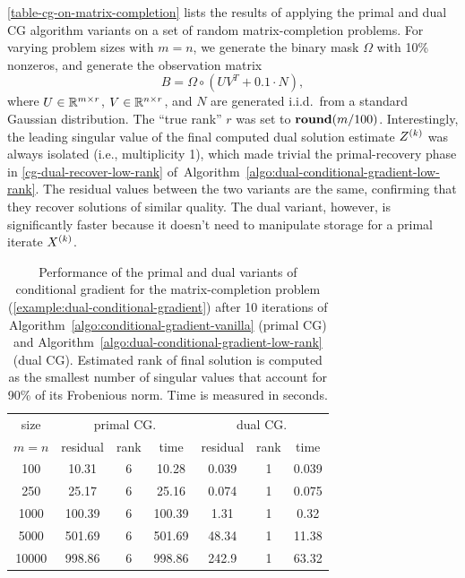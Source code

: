 \begin{example}
  \autoref{table-cg-on-matrix-completion} lists the results of applying the primal
  and dual CG algorithm variants on a set of random matrix-completion problems.
  For varying problem sizes with $m=n$, we generate the binary mask $\Omega$
  with 10\% nonzeros, and generate the observation matrix
  \[
    B = \Omega\circ(UV^T+0.1\cdot N), 
  \]
  where $U\in\mathbb{R}^{m\times r}$, $V\in\mathbb{R}^{n\times r}$, and $N$ are generated
  i.i.d.~from a standard Gaussian distribution. The ``true rank'' $r$ was set to
  $\mathop{\bf round}(m/100)$. Interestingly, the leading singular value of the
  final computed dual solution estimate $Z^{(k)}$ was always isolated (i.e.,
  multiplicity 1), which made trivial the primal-recovery phase in
  \autoref{cg-dual-recover-low-rank}
  of~Algorithm~\ref{algo:dual-conditional-gradient-low-rank}. The residual values between
  the two variants are the same, confirming that they recover solutions of
  similar quality. The dual variant, however, is significantly faster because it
  doesn't need to manipulate storage for a primal iterate $X^{(k)}$.
  
  \begin{table}[t]
    \centering
    \begin{tabular}{ccccccc}
        \toprule
        size & \multicolumn{3}{c}{primal CG.} & \multicolumn{3}{c}{dual CG.}\\
        \cmidrule(lr){1-1}\cmidrule(lr){2-4}\cmidrule(lr){5-7}
        $m=n$ & residual & rank & time & residual & rank & time \\ 
        \hline
        100      &10.31  &6     &10.28 &0.039     &1     &0.039 \\
        250      &25.17  &6     &25.16 &0.074     &1     &0.075 \\
        1000    &100.39  &6    &100.39 &1.31      &1     &0.32 \\
        5000    &501.69  &6    &501.69 &48.34     &1     &11.38 \\
        10000   &998.86  &6    &998.86 &242.9     &1     &63.32 \\
        \bottomrule
    \end{tabular}
      \caption{Performance of the primal and dual variants of conditional gradient
      for the matrix-completion problem
      (\autoref{example:dual-conditional-gradient})
      after 10 iterations of
      Algorithm~\ref{algo:conditional-gradient-vanilla} (primal CG) and
         Algorithm~\ref{algo:dual-conditional-gradient-low-rank} (dual CG). Estimated rank of final
         solution is computed as the smallest number of singular values that
         account for 90\% of its Frobenious norm. Time is measured in
         seconds.}
      \label{table-cg-on-matrix-completion}
  \end{table}
  
\end{example}



